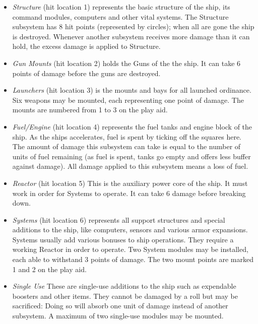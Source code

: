\documentclass[a4paper,12pt,notitlepage,twocolumn]{article}
\begin{document}
\begin{itemize}
\item \emph{Structure} (hit location 1) represents the basic structure of the
  ship, its command modules, computers and other vital systems. The
  Structure subsystem has 8 hit points (represented by circles); when
  all are gone the ship is destroyed. Whenever another subsystem receives 
  more damage than it can hold, the excess damage is applied to Structure. 
\item \emph{Gun Mounts} (hit location 2) holds the Guns of the the ship.
  It can take 6 points of damage before the guns are destroyed. 
\item \emph{Launchers} (hit location 3) is the mounts and bays for all launched ordinance. 
Six weapons may be mounted, each representing one point of damage. The mounts are numbered
from 1 to 3 on the play aid.
\item \emph{Fuel/Engine} (hit location 4) represents the fuel tanks and
engine block of the ship. As the ships accelerates, fuel is spent by ticking off
  the squares here. The amount of damage this subsystem can take is equal to the number 
  of units of fuel remaining (as fuel is spent, tanks go empty and offers less buffer against
  damage). All damage applied to this subsystem means a loss of fuel. 
\item \emph{Reactor} (hit location 5) This is the auxiliary power core of the ship. It must work
in order for Systems to operate. It can take 6 damage before breaking down. 
\item \emph{Systems} (hit location 6) represents all support structures and special
additions to the ship, like computers, sensors and various armor expansions. Systems usually
add various bonuses to ship operations. They require a working Reactor in order to 
operate. Two System modules may be installed, each able to withstand 3 points of damage. 
The two mount points are marked 1 and 2 on the play aid.
\item \emph{Single Use} These are single-use additions to the ship such as expendable
boosters and other items. They cannot be damaged by a roll but may be sacrificed: Doing so 
will absorb one unit of damage instead of another subsystem. A maximum of two 
single-use modules may be mounted. 
\end{itemize}
\end{document}
